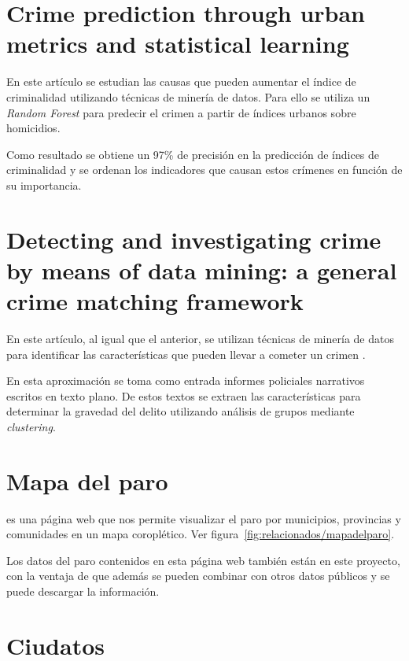 
\section{Crime prediction through urban metrics and statistical learning}

En este artículo se estudian las causas que pueden aumentar el índice de criminalidad utilizando técnicas de minería de datos. Para ello se utiliza un \textit{Random Forest} para predecir el crimen a partir de índices urbanos sobre homicidios. \cite{art:crimeprediction}

Como resultado se obtiene un 97\% de precisión en la predicción de índices de criminalidad y se ordenan los indicadores que causan estos crímenes en función de su importancia.

\section{Detecting and investigating crime by means of data mining: a general crime matching framework}

En este artículo, al igual que el anterior, se utilizan técnicas de minería de datos para identificar las características que pueden llevar a cometer un crimen \cite{art:crimeprediction2}.

En esta aproximación se toma como entrada informes policiales narrativos escritos en texto plano. De estos textos se extraen las características para determinar la gravedad del delito utilizando análisis de grupos mediante \textit{clustering}.

\section{Mapa del paro}

 es una página web que nos permite visualizar el paro por municipios, provincias y comunidades en un mapa coroplético. Ver figura~\ref{fig:relacionados/mapadelparo}.

Los datos del paro contenidos en esta página web también están en este proyecto, con la ventaja de que además se pueden combinar con otros datos públicos y se puede descargar la información.


\section{Ciudatos}


